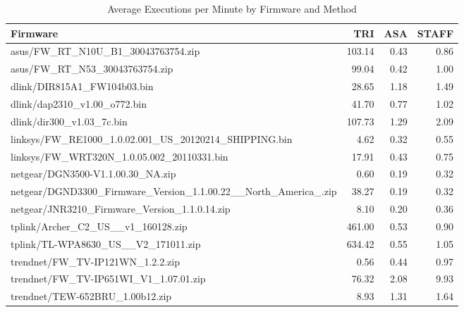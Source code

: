 \begin{table}[htbp]
\centering
\caption{Average Executions per Minute by Firmware and Method}
\label{tab:execs_per_min}
\begin{tabular}{lrrr}
\toprule
Firmware & TRI & ASA & STAFF \\
\midrule
asus/FW_RT_N10U_B1_30043763754.zip & 103.14 & 0.43 & 0.86 \\
asus/FW_RT_N53_30043763754.zip & 99.04 & 0.42 & 1.00 \\
dlink/DIR815A1_FW104b03.bin & 28.65 & 1.18 & 1.49 \\
dlink/dap2310_v1.00_o772.bin & 41.70 & 0.77 & 1.02 \\
dlink/dir300_v1.03_7c.bin & 107.73 & 1.29 & 2.09 \\
linksys/FW_RE1000_1.0.02.001_US_20120214_SHIPPING.bin & 4.62 & 0.32 & 0.55 \\
linksys/FW_WRT320N_1.0.05.002_20110331.bin & 17.91 & 0.43 & 0.75 \\
netgear/DGN3500-V1.1.00.30_NA.zip & 0.60 & 0.19 & 0.32 \\
netgear/DGND3300_Firmware_Version_1.1.00.22__North_America_.zip & 38.27 & 0.19 & 0.32 \\
netgear/JNR3210_Firmware_Version_1.1.0.14.zip & 8.10 & 0.20 & 0.36 \\
tplink/Archer_C2_US__v1_160128.zip & 461.00 & 0.53 & 0.90 \\
tplink/TL-WPA8630_US__V2_171011.zip & 634.42 & 0.55 & 1.05 \\
trendnet/FW_TV-IP121WN_1.2.2.zip & 0.56 & 0.44 & 0.97 \\
trendnet/FW_TV-IP651WI_V1_1.07.01.zip & 76.32 & 2.08 & 9.93 \\
trendnet/TEW-652BRU_1.00b12.zip & 8.93 & 1.31 & 1.64 \\
\bottomrule
\end{tabular}
\end{table}

